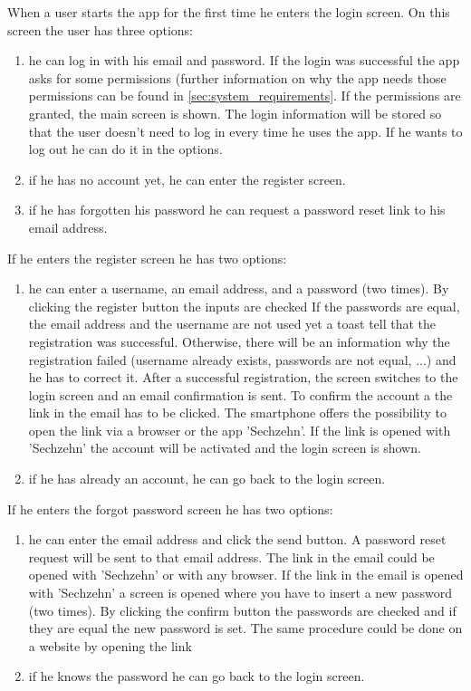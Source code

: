 \documentclass[11pt, accentcolor=tud1c]{tudreport}
\begin{document}
When a user starts the app for the first time he enters the login screen. On this screen the user has three options:
\begin{enumerate}
\item he can log in with his email and password. If the login was successful the app asks for some permissions (further information on why the app needs those permissions can be found in \ref{sec:system_requirements}.
If the permissions are granted, the main screen is shown. The login information will be stored so that the user doesn't need to log in every time he uses the app. If he wants to log out he can do it in the options.
\item if he has no account yet, he can enter the register screen.
\item if he has forgotten his password he can request a password reset link to his email address.
\end{enumerate}
If he enters the register screen he has two options:   
\begin{enumerate}
\item he can enter a username, an email address, and a password (two times). By clicking the register button the inputs are checked If the passwords are equal, the email address and the username are not used yet a toast tell that the registration was successful. Otherwise, there will be an information why the registration failed (username already exists, passwords are not equal, ...) and he has to correct it. After a successful registration, the screen switches to the login screen and an email confirmation is sent. To confirm the account a the link in the email has to be clicked. The smartphone offers the possibility to open the link via a browser or the app 'Sechzehn'. If the link is opened with 'Sechzehn' the account will be activated and the login screen is shown.  
\item if he has already an account, he can go back to the login screen.
\end{enumerate}
If he enters the forgot password screen he has two options:
\begin{enumerate}
\item he can enter the email address and click the send button. A password reset request will be sent to that email address. The link in the email could be opened with 'Sechzehn' or with any browser. If the link in the email is opened with 'Sechzehn' a screen is opened where you have to insert a new password (two times). By clicking the confirm button the passwords are checked and if they are equal the new password is set. The same procedure could be done on a website by opening the link 
\item if he knows the password he can go back to the login screen.
\end{enumerate}
\end{document}
